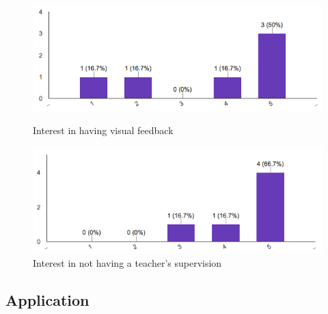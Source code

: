 \begin{figure}[!ht]
	\centering
	\begin{minipage}{.5\textwidth}
		\centering
		\includegraphics[scale=0.5]{Figures/responses/interest_visual_feedback.png}
		\caption{Interest in having visual feedback}
		\label{fig:int_visual_feedbak}
	\end{minipage}%
	\begin{minipage}{.5\textwidth}
		\centering
		\includegraphics[scale=0.5]{Figures/responses/interest_no_teacher.png}
		\caption{Interest in not having a teacher's supervision}
		\label{fig:int_no_teacher}
	\end{minipage}
\end{figure}


\subsection*{Application}
\label{sub:Application}

